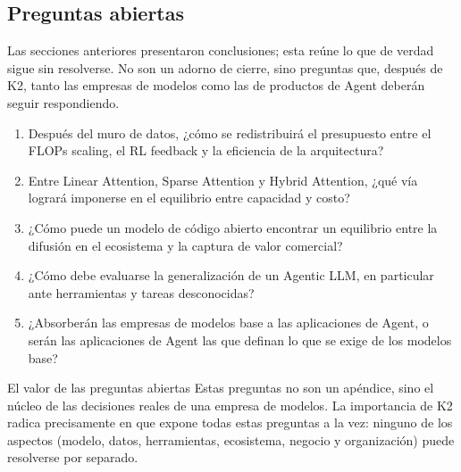 \subsection{Preguntas abiertas}

Las secciones anteriores presentaron conclusiones; esta reúne lo que de verdad sigue sin resolverse. No son un adorno de cierre, sino preguntas que, después de K2, tanto las empresas de modelos como las de productos de Agent deberán seguir respondiendo.

\begin{enumerate}
\item Después del muro de datos, ¿cómo se redistribuirá el presupuesto entre el FLOPs scaling, el RL feedback y la eficiencia de la arquitectura?
\item Entre Linear Attention, Sparse Attention y Hybrid Attention, ¿qué vía logrará imponerse en el equilibrio entre capacidad y costo?
\item ¿Cómo puede un modelo de código abierto encontrar un equilibrio entre la difusión en el ecosistema y la captura de valor comercial?
\item ¿Cómo debe evaluarse la generalización de un Agentic LLM, en particular ante herramientas y tareas desconocidas?
\item ¿Absorberán las empresas de modelos base a las aplicaciones de Agent, o serán las aplicaciones de Agent las que definan lo que se exige de los modelos base?
\end{enumerate}

\begin{warningbox}{El valor de las preguntas abiertas}
Estas preguntas no son un apéndice, sino el núcleo de las decisiones reales de una empresa de modelos. La importancia de K2 radica precisamente en que expone todas estas preguntas a la vez: ninguno de los aspectos (modelo, datos, herramientas, ecosistema, negocio y organización) puede resolverse por separado.
\end{warningbox}

